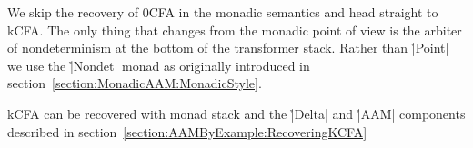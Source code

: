 We skip the recovery of 0CFA in the monadic semantics and head straight to
kCFA.
%
The only thing that changes from the monadic point of view is the arbiter of
nondeterminism at the bottom of the transformer stack.
%
Rather than \h|Point| we use the \h|Nondet| monad as originally introduced in
section~\ref{section:MonadicAAM:MonadicStyle}.


kCFA can be recovered with monad stack
%
%
and the \h|Delta| and \h|AAM| components described in
section~\ref{section:AAMByExample:RecoveringKCFA}
%

